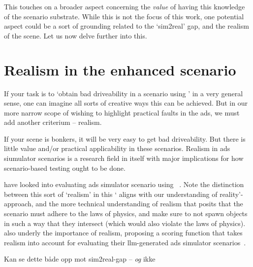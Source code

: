 This touches on a broader aspect concerning the \emph{value} of having this knowledge of the
scenario substrate. While this is not the focus of this work, one potential aspect could be a sort
of grounding related to the `sim2real' gap, and the realism of the scene. Let us now delve further
into this.

\section{Realism in the enhanced scenario}

If your task is to `obtain bad driveability in a scenario using ' in a very general
sense, one can imagine all sorts of creative ways this can be achieved. But in our more narrow scope
of wishing to highlight practical faults in the \acrshort{ads}, we must add another criterium --
realism.

If your scene is bonkers, it will be very easy to get bad driveability. But there is little value
and/or practical applicability in these scenarios. Realism in \acrshort{ads} siumulator scenarios is
a research field in itself with major implications for how scenario-based testing ought to be done.

\citeauthor{RealityBites} have looked into evaluating \acrshort{ads} simulator scenario using
~\cite[40]{RealityBites}. Note the distinction between this sort of `realism' in
this ` aligns with our understanding of reality'-approach, and the more technical understanding of
realism that posits that the scenario must adhere to the laws of physics, and make sure to not spawn
objects in such a way that they intersect (which would also violate the laws of physics).
\citeauthor{LLMScenarioChang24} also underly the importance of realism, proposing a scoring function
that takes realism into account for evaluating their \acrshort{llm}-generated \acrshort{ads}
simulator scenarios~\cite[6581-6582]{LLMScenarioChang24}.


Kan se dette både opp mot sim2real-gap -- \emph{og} ikke






